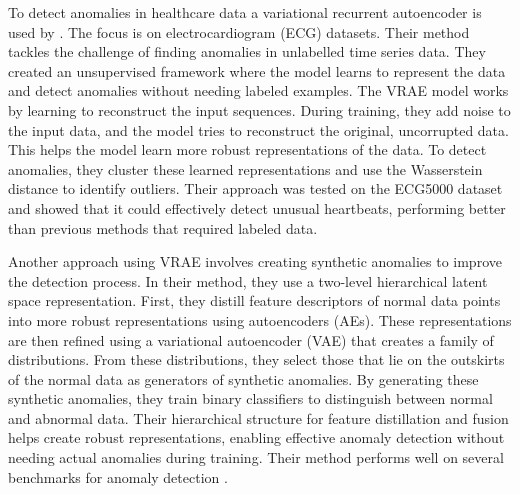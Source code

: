 %
To detect anomalies in healthcare data a variational recurrent autoencoder is used by . %
The focus is on electrocardiogram (ECG) datasets. Their method tackles the challenge of finding anomalies in unlabelled time series data. They created an unsupervised framework where the model learns to represent the data and detect anomalies without needing labeled examples.
The VRAE model works by learning to reconstruct the input sequences. During training, they add noise to the input data, and the model tries to reconstruct the original, uncorrupted data. This helps the model learn more robust representations of the data. To detect anomalies, they cluster these learned representations and use the Wasserstein distance to identify outliers. Their approach was tested on the ECG5000 dataset and showed that it could effectively detect unusual heartbeats, performing better than previous methods that required labeled data.

%
Another approach using VRAE involves creating synthetic anomalies to improve the detection process. In their method, they use a two-level hierarchical latent space representation. First, they distill feature descriptors of normal data points into more robust representations using autoencoders (AEs). These representations are then refined using a variational autoencoder (VAE) that creates a family of distributions. From these distributions, they select those that lie on the outskirts of the normal data as generators of synthetic anomalies.
By generating these synthetic anomalies, they train binary classifiers to distinguish between normal and abnormal data. Their hierarchical structure for feature distillation and fusion helps create robust representations, enabling effective anomaly detection without needing actual anomalies during training. Their method performs well on several benchmarks for anomaly detection  \cite{ramirez_rivera_anomaly_2022}.

